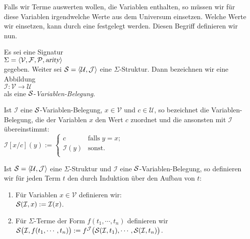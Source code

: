Falls wir Terme auswerten wollen, die Variablen enthalten, so müssen wir für diese
Variablen irgendwelche Werte aus dem Universum einsetzen.  Welche Werte wir einsetzen, kann
durch eine  festgelegt werden.  Diesen Begriff definieren wir
nun.

\begin{Definition}
    Es sei eine  Signatur \\[0.2cm]
    \hspace*{1.3cm} $\Sigma = \langle \mathcal{V}, \mathcal{F}, \mathcal{P}, \textsl{arity} \rangle$ \\[0.2cm]
    gegeben.  Weiter sei $\mathcal{S} = \langle \mathcal{U}, \mathcal{J} \rangle$ eine $\Sigma$-Struktur.  Dann bezeichnen wir 
     eine Abbildung \\[0.2cm]
    \hspace*{1.3cm} $\mathcal{I}: \mathcal{V} \rightarrow \mathcal{U}$ \\[0.2cm]
    als eine {\color{blue}$\mathcal{S}$-\emph{Variablen-Belegung}}.

    Ist $\mathcal{I}$ eine $\mathcal{S}$-Variablen-Belegung,
    $x \in \mathcal{V}$ und $c \in \mathcal{U}$, so bezeichnet  die Variablen-Belegung, die 
    der Variablen $x$ den Wert $c$ zuordnet und die ansonsten mit $\mathcal{I}$ übereinstimmt: \\[0.2cm]
    \hspace*{1.3cm} 
    $\mathcal{I}[x/c](y) := \left\{
    \begin{array}{ll}
    c               & \mbox{falls}\; y = x;  \\
    \mathcal{I}(y)  & \mbox{sonst}.          \\
    \end{array}
    \right.$ \eox
\end{Definition}


\begin{Definition}
    Ist $\struct = \pair(\mathcal{U},\mathcal{J})$ eine $\Sigma$-Struktur und $\mathcal{I}$ eine $\mathcal{S}$-Variablen-Belegung,
    so definieren wir für jeden Term $t$ den  
     durch Induktion über
    den Aufbau von $t$:
    \begin{enumerate}
    \item Für Variablen $x \in \mathcal{V}$ definieren wir: \\[0.2cm]
          \hspace*{1.3cm} $\mathcal{S}(\mathcal{I}, x) := \mathcal{I}(x)$.
    \item Für $\Sigma$-Terme der Form $f(t_1,\cdots,t_n)$ definieren wir \\[0.2cm]
          \hspace*{1.3cm} $\mathcal{S}\bigl(\mathcal{I}, f(t_1,\cdots,t_n)\bigr) := 
                           f^\mathcal{J}\bigl( \mathcal{S}(\mathcal{I}, t_1), \cdots, \mathcal{S}(\mathcal{I}, t_n) \bigr)$.
                           \eox
    \end{enumerate}
\end{Definition}

